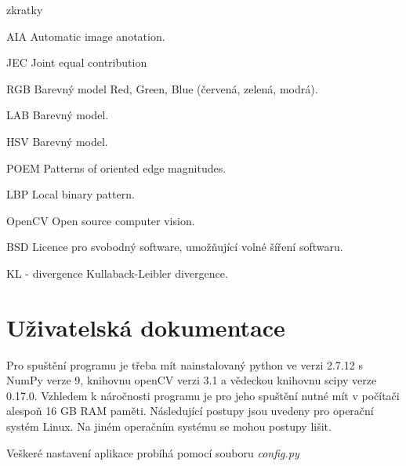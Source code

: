 \documentclass[czech,BP]{thesiskiv}
\begin{document}
\begin{labeling}{zkratky}
	\item [AIA] Automatic image anotation.	
	\item [JEC] Joint equal contribution
	\item [RGB] Barevný model Red, Green, Blue (červená, zelená, modrá).
	\item [LAB] Barevný model. 
	\item [HSV] Barevný model. 
	\item [POEM] Patterns of oriented edge magnitudes.
	\item [LBP] Local binary pattern.
	\item [OpenCV] Open source computer vision.
	\item [BSD] Licence pro svobodný software, umožňující volné šíření softwaru.
	\item [KL - divergence] Kullaback-Leibler divergence.
\end{labeling}

\nocite{*}

{\raggedright\small

}

\appendix
\chapter{Uživatelská dokumentace}
\par Pro spuštění programu je třeba mít nainstalovaný python ve verzi 2.7.12 s NumPy verze 9, knihovnu openCV verzi 3.1 a vědeckou knihovnu scipy verze 0.17.0. Vzhledem k náročnosti programu je pro jeho spuštění nutné mít v počítači alespoň 16 GB RAM paměti. Následující postupy jsou uvedeny pro operační systém Linux. Na jiném operačním systému se mohou postupy lišit.

\par Veškeré nastavení aplikace probíhá pomocí souboru \textit{config.py}
\end{document}
